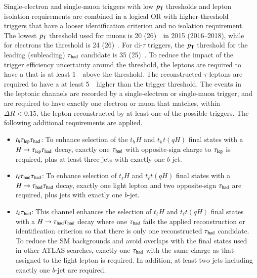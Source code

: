 Single-electron and single-muon triggers with low $p_{\text{T}}$ thresholds and lepton isolation requirements are combined in a logical OR 
with higher-threshold triggers that have a looser identification criterion and no isolation requirement.
The lowest $p_{\text{T}}$ threshold used for muons is 20 (26)~\gev\ in 2015 (2016--2018), while for electrons the threshold is 24 (26)~\gev.
For di-$\tau$ triggers, the $p_{\text{T}}$ threshold for the leading (subleading) $\tau_{\mathrm{had}}$ candidate is 35 (25)~\gev.
To reduce the impact of the trigger efficiency uncertainty around the threshold, the leptons are required to have a \pt that is at least 1~\GeV\ above the threshold. 
The reconstructed $\tau$-leptons are required to have a \pt at least 5~\GeV\ higher than the trigger threshold.
The events in the leptonic channels are recorded by a single-electron or single-muon trigger, and are required to have exactly one electron or muon that matches, within $\Delta R < 0.15$, the lepton reconstructed by at least one of the possible triggers. The following additional requirements are applied.
\begin{itemize}
\item $t_h\tau_{\mathrm{lep}} \tau_{\mathrm{had}}$: To enhance selection of the $t_hH$ and $t_ht(qH)$ final states with a $H\rightarrow\tau_{\mathrm{lep}} \tau_{\mathrm{had}}$ decay, exactly one $\tau_{\mathrm{had}}$ with opposite-sign charge to $\tau_{\mathrm{lep}}$ is required, plus at least three jets with exactly one $b$-jet.
\item $t_{\ell}\tau_{\mathrm{had}} \tau_{\mathrm{had}}$: To enhance selection of $t_{\ell}H$ and $t_{\ell}t(qH)$ final states with a $H\rightarrow\tau_{\mathrm{had}} \tau_{\mathrm{had}}$ decay, exactly one light lepton and two opposite-sign $\tau_{\mathrm{had}}$ are required,
  plus jets with exactly one $b$-jet.
\item $t_{\ell}\tau_{\mathrm{had}}$: This channel enhances the selection of $t_{\ell}H$ and $t_{\ell}t(qH)$ final states with a $H\rightarrow\tau_{\mathrm{had}} \tau_{\mathrm{had}}$ decay where one $\tau_{\mathrm{had}}$ fails the applied reconstruction or identification
  criterion so that there is only one reconstructed $\tau_{\mathrm{had}}$ candidate.
  To reduce the SM backgrounds and avoid overlaps with the final states used in other ATLAS searches, exactly one $\tau_{\mathrm{had}}$ with the same charge as that assigned to the light lepton is required.
  In addition, at least two jets including exactly one $b$-jet are required.
\end{itemize}

